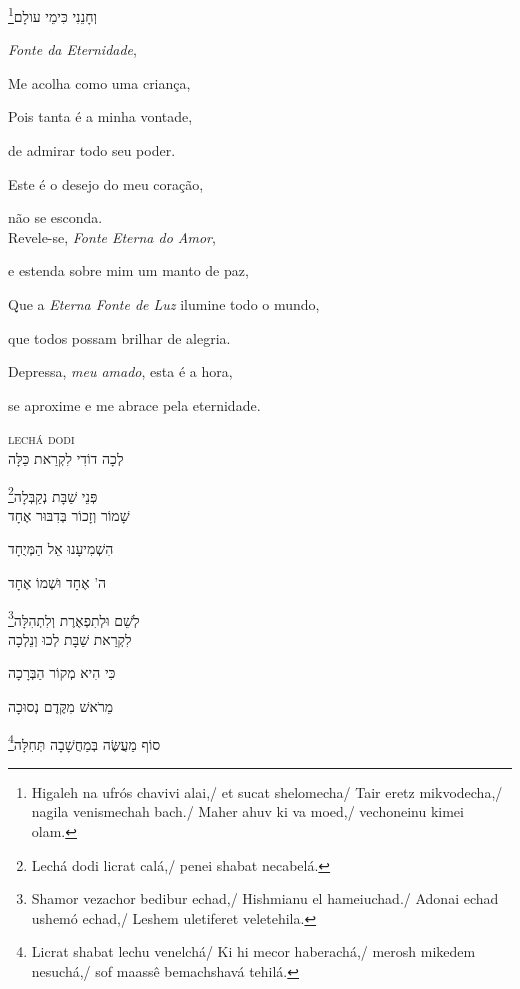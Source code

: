 וְחָנֵנִי כִּימֵי עולָם\footnote{
Higaleh na ufrós chavivi alai,/
et sucat shelomecha/ Tair eretz mikvodecha,/ nagila venismechah bach./ Maher ahuv ki va moed,/
vechoneinu kimei olam.}

\movetooddpage
\raggedright

\emph{Fonte da Eternidade},

Me acolha como uma criança,

Pois tanta é a minha vontade,

de admirar todo seu poder.

Este é o desejo do meu coração,

não se esconda.\\[10pt]

Revele-se, \emph{Fonte Eterna do Amor},

e estenda sobre mim um manto de paz,

Que a \emph{Eterna Fonte de Luz} ilumine todo o mundo,

que todos possam brilhar de alegria.

Depressa, \emph{meu amado}, esta é a hora,

se aproxime e me abrace pela eternidade.

\movetoevenpage
\raggedleft

\textsc{lechá dodi}\\[15pt]

לְכָה דוֹדִי לִקְרַאת כַּלָּה

פְּנֵי שַׁבָּת נְקַבְּלָה\footnote{Lechá dodi licrat calá,/ penei shabat necabelá.}\\[10pt]

שָׁמוֹר וְזָכוֹר בְּדִבּוּר אֶחָד

הִשְׁמִיעָנוּ אֵל הַמְּיֻחָד

ה' אֶחָד וּשְׁמוֹ אֶחָד

לְשֵׁם וּלְתִפְאֶרֶת וְלִתְהִלָּה\footnote{Shamor vezachor bedibur echad,/ Hishmianu el hameiuchad./ Adonai echad ushemó echad,/ Leshem uletiferet veletehila.}\\[10pt]

לִקְרַאת שַׁבָּת לְכוּ וְנֵלְכָה

כִּי הִיא מְקוֹר הַבְּרָכָה

מֵרֹאשׁ מִקֶּדֶם נְסוּכָה

סוֹף מַעֲשֶּׂה בְּמַחֲשָׁבָה תְּחִלָּה\footnote{Licrat shabat lechu venelchá/ Ki hi mecor haberachá,/ merosh mikedem nesuchá,/ sof maassê bemachshavá tehilá.}\\[10pt]

